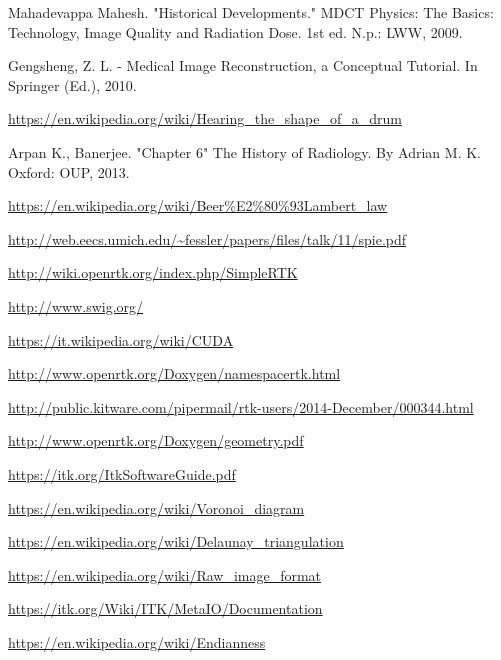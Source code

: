 \documentclass[a4paper,12pt, doubleside]{report}
\begin{document}
\begin{thebibliography}{1}
        Mahadevappa Mahesh. "Historical Developments." MDCT Physics: The Basics: Technology, Image Quality and Radiation Dose. 1st ed. N.p.: LWW, 2009.
    
        Gengsheng, Z. L. - Medical Image Reconstruction, a Conceptual Tutorial. In Springer (Ed.), 2010.
    
        \url{https://en.wikipedia.org/wiki/Hearing_the_shape_of_a_drum}
    
        Arpan K., Banerjee. "Chapter 6" The History of Radiology. By Adrian M. K. Oxford: OUP, 2013.
        
        \url{https://en.wikipedia.org/wiki/Beer%E2%80%93Lambert_law}
        
        \url{http://web.eecs.umich.edu/~fessler/papers/files/talk/11/spie.pdf}    
        
        \url{http://wiki.openrtk.org/index.php/SimpleRTK}
        
        \url{http://www.swig.org/}    
        
        \url{https://it.wikipedia.org/wiki/CUDA}
        
        \url{http://www.openrtk.org/Doxygen/namespacertk.html}
        
        \url{http://public.kitware.com/pipermail/rtk-users/2014-December/000344.html}
    
        \url{http://www.openrtk.org/Doxygen/geometry.pdf}
        
        \url{https://itk.org/ItkSoftwareGuide.pdf}   
        
        \url{https://en.wikipedia.org/wiki/Voronoi_diagram}
        
        \url{https://en.wikipedia.org/wiki/Delaunay_triangulation}
    
        \url{https://en.wikipedia.org/wiki/Raw_image_format}
    
        \url{https://itk.org/Wiki/ITK/MetaIO/Documentation} 
    
        \url{https://en.wikipedia.org/wiki/Endianness}



\end{thebibliography}
\end{document}
